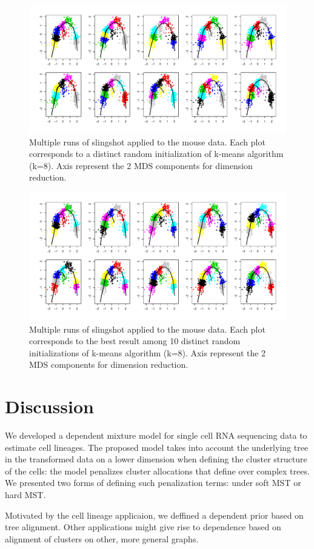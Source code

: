 \begin{figure}[H]
  \centering
  \includegraphics[scale = 0.55]{Img/fletcher/slinghot_estimates.pdf}
\caption{Multiple runs of slingshot applied to the mouse data. Each plot corresponds to a distinct random initialization of k-means algorithm (k=8). Axis represent the 2 MDS components for dimension reduction.}
\label{fig:fletcher_slingshot_kmeans}
\end{figure}

\begin{figure}[H]
  \centering
  \includegraphics[scale = 0.55]{Img/fletcher/slinghot_estimates_rep.pdf}
\caption{Multiple runs of slingshot applied to the mouse data. Each plot corresponds to the best result among 10 distinct random initializations of k-means algorithm (k=8). Axis represent the 2 MDS components for dimension reduction.}
\label{fig:fletcher_slingshot_kmeans2}
\end{figure}

\section{Discussion}

We developed a dependent mixture model for single cell RNA sequencing data to estimate cell lineages. The proposed model takes into account the underlying tree in the transformed data on a lower dimension when defining the cluster structure of the cells: the model penalizes cluster allocations that define over complex trees. We presented two forms of defining such penalization terms: under soft MST or hard MST.

Motivated by the cell lineage applicaion, we deffined a dependent prior based on tree alignment. Other applications might give rise to dependence based on alignment of clusters on other, more general graphs.





 